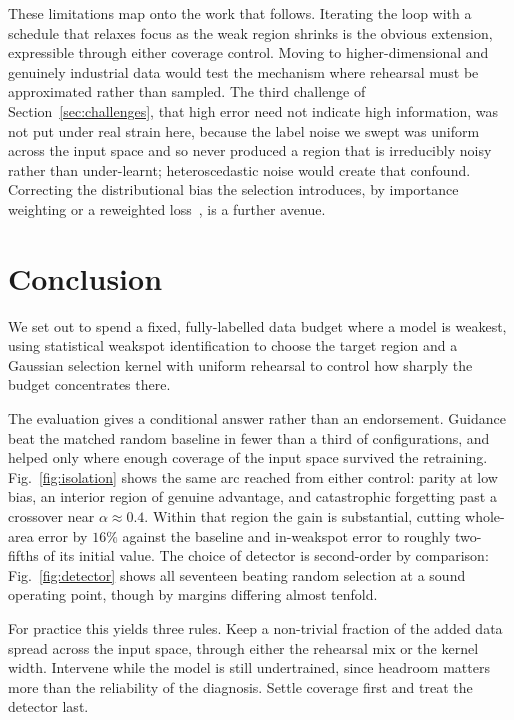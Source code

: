 \documentclass[conference]{IEEEtran}
\begin{document}
These limitations map onto the work that follows. Iterating the loop with a schedule
that relaxes focus as the weak region shrinks is the obvious extension, expressible
through either coverage control. Moving to higher-dimensional and genuinely industrial
data would test the mechanism where rehearsal must be approximated rather than sampled.
The third challenge of Section~\ref{sec:challenges}, that high error need not indicate
high information, was not put under real strain here, because the label noise we swept
was uniform across the input space and so never produced a region that is irreducibly
noisy rather than under-learnt; heteroscedastic noise would create that confound.
Correcting the distributional bias the selection introduces, by importance weighting or
a reweighted loss~\cite{farquhar2021,katharopoulos2018}, is a further avenue.

\section{Conclusion}
\label{sec:conclusion}

We set out to spend a fixed, fully-labelled data budget where a model is weakest,
using statistical weakspot identification to choose the target region and a Gaussian
selection kernel with uniform rehearsal to control how sharply the budget concentrates
there.

The evaluation gives a conditional answer rather than an endorsement. Guidance beat the
matched random baseline in fewer than a third of configurations, and helped only where
enough coverage of the input space survived the retraining. Fig.~\ref{fig:isolation}
shows the same arc reached from either control: parity at low bias, an interior region
of genuine advantage, and catastrophic forgetting past a crossover near
$\alpha\approx0.4$. Within that region the gain is substantial, cutting whole-area error
by $16\%$ against the baseline and in-weakspot error to roughly two-fifths of its initial
value. The choice of detector is second-order by comparison:
Fig.~\ref{fig:detector} shows all seventeen beating random selection at a sound operating
point, though by margins differing almost tenfold.

For practice this yields three rules. Keep a non-trivial fraction of the added data
spread across the input space, through either the rehearsal mix or the kernel width.
Intervene while the model is still undertrained, since headroom matters more than the
reliability of the diagnosis. Settle coverage first and treat the detector last.
\end{document}
